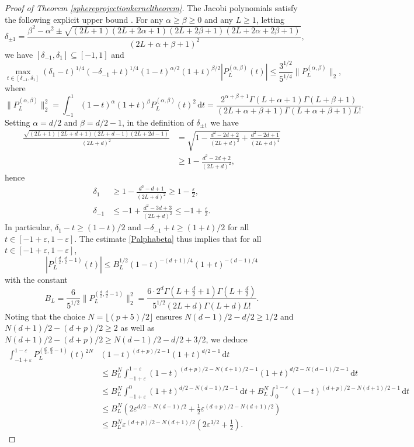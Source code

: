 \documentclass[11pt,a4paper]{article}
\theoremstyle{definition}
\begin{document}
\begin{proof}[Proof of Theorem \ref{sphereprojectionkerneltheorem}]
The Jacobi polynomials satisfy the following explicit upper bound \cite[Theorem 1]{KR2}. For any $\alpha \ge \beta \ge 0$ and any $L \ge 1$, letting
\[ \delta_{\pm 1} = \frac{\beta^2 - \alpha^2 \pm \sqrt{(2L+1)(2L+2\alpha+1)(2L+2\beta+1)(2L+2\alpha+2\beta+1)}}{(2L+\alpha+\beta+1)^2}, \]
we have $[\delta_{-1}, \delta_1] \subseteq [-1,1]$ and
\begin{equation}\label{Palphabeta}
\max_{t \in [\delta_{-1}, \delta_1]} (\delta_1-t)^{1/4} (-\delta_{-1}+t)^{1/4} (1-t)^{\alpha/2}(1+t)^{\beta/2} |P_L^{(\alpha, \beta)}(t)| \le \frac{3^{1/2}}{5^{1/4}} \| P_L^{(\alpha, \beta)} \|_2 ,
\end{equation}
where
\[ \| P_L^{(\alpha, \beta)} \|_2^2 = \int_{-1}^1 (1-t)^{\alpha}(1+t)^{\beta} P_L^{(\alpha, \beta)}(t)^2 \, \mathrm{d}t = \frac{2^{\alpha+\beta+1}\Gamma (L+\alpha+1) \Gamma (L+\beta+1)}{(2L+\alpha+\beta+1)\Gamma (L+\alpha+\beta+1)L!} . \]
Setting $\alpha=d/2$ and $\beta=d/2-1$, in the definition of $\delta_{\pm 1}$ we have
\[ \begin{split} \frac{\sqrt{(2L+1)(2L+d+1)(2L+d-1)(2L+2d-1)}}{(2L+d)^2} &= \sqrt{1 - \frac{d^2-2d+2}{(2L+d)^2} + \frac{d^2-2d+1}{(2L+d)^4}} \\ &\ge 1-\frac{d^2-2d+2}{(2L+d)^2} , \end{split} \]
hence
\[ \begin{split} \delta_1 &\ge 1-\frac{d^2-d+1}{(2L+d)^2} \ge 1-\frac{\varepsilon}{2}, \\ \delta_{-1} &\le -1+\frac{d^2-3d+3}{(2L+d)^2} \le -1+\frac{\varepsilon}{2} . \end{split} \]
In particular, $\delta_1 - t \ge (1-t)/2$ and $-\delta_{-1}+t \ge (1+t)/2$ for all $t \in [-1+\varepsilon, 1-\varepsilon]$. The estimate \eqref{Palphabeta} thus implies that for all $t \in [-1+\varepsilon, 1-\varepsilon]$,
\[ |P_L^{(\frac{d}{2}, \frac{d}{2}-1)}(t)| \le B_L^{1/2} (1-t)^{-(d+1)/4} (1+t)^{-(d-1)/4} \]
with the constant
\[ B_L= \frac{6}{5^{1/2}} \| P_L^{(\frac{d}{2}, \frac{d}{2}-1)} \|_2^2 = \frac{6 \cdot 2^d \Gamma \left( L+\frac{d}{2}+1 \right) \Gamma \left( L + \frac{d}{2} \right)}{5^{1/2} (2L+d) \Gamma (L+d) L!} . \]
Noting that the choice $N = \lfloor (p+5)/2 \rfloor$ ensures $N(d-1)/2 - d/2 \ge 1/2$ and $N(d+1)/2 - (d+p)/2 \ge 2$ as well as $N(d+1)/2 - (d+p)/2 \ge N(d-1)/2 - d/2 + 3/2$, we deduce
\[ \begin{split} \int_{-1+\varepsilon}^{1-\varepsilon} P_L^{(\frac{d}{2}, \frac{d}{2}-1)}(t)^{2N} &(1-t)^{(d+p)/2-1} (1+t)^{d/2-1} \, \mathrm{d}t \\ &\le B_L^N \int_{-1+\varepsilon}^{1-\varepsilon} (1-t)^{(d+p)/2-N(d+1)/2-1} (1+t)^{d/2-N(d-1)/2-1} \, \mathrm{d}t \\ &\le B_L^N \int_{-1+\varepsilon}^0 (1+t)^{d/2-N(d-1)/2-1} \, \mathrm{d}t + B_L^N \int_0^{1-\varepsilon} (1-t)^{(d+p)/2-N(d+1)/2-1} \, \mathrm{d}t \\ &\le B_L^N \left( 2 \varepsilon^{d/2-N(d-1)/2} + \frac{1}{2} \varepsilon^{(d+p)/2-N(d+1)/2}\right) \\ &\le B_L^{N} \varepsilon^{(d+p)/2-N(d+1)/2} \left(2 \varepsilon^{3/2}+\frac{1}{2} \right) . \end{split} \]

\end{proof}
\end{document}
